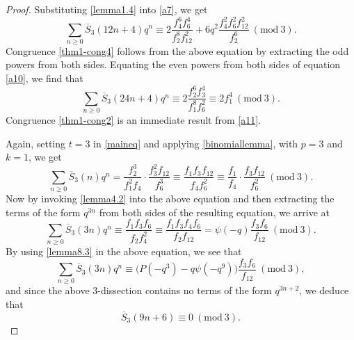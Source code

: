 \documentclass[12pt]{amsart}
\theoremstyle{plain}
\theoremstyle{definition}
\begin{document}
\begin{proof}
Substituting \eqref{lemma1.4} into \eqref{a7}, we get
\begin{equation}
\sum_{n \geq 0} \overline{S}_{3}(12n+4) q^{n} \equiv  2 \dfrac{f_{4}^{6} f_{6}^{4}}{f_{2}^{8} f_{12}^{2}} + 6 q^{2}  \dfrac{f_{4}^{2} f_{6}^{2} f_{12}^{2}}{f_{2}^{6}}  \ (\mathrm{mod} \ 3).  \label{a10}
\end{equation}
Congruence \eqref{thm1-cong4} follows from the above equation by extracting the odd powers from both sides. Equating the even powers from both sides of equation \eqref{a10}, we find that
\begin{equation}
\sum_{n \geq 0} \overline{S}_{3}(24n+4) q^{n} \equiv  2 \dfrac{f_{2}^{6} f_{3}^{4}}{f_{1}^{8} f_{6}^{2}} \equiv 2f_{1}^{4}  \ (\mathrm{mod} \ 3).  \label{a11}
\end{equation}
Congruence \eqref{thm1-cong2} is an immediate result from \eqref{a11}.

Again, setting $t=3$ in \eqref{maineq} and applying \eqref{binomiallemma}, with $p=3$ and $k=1$, we get 
\begin{equation*}
\sum_{n \geq 0} \overline{S}_{3}(n) q^{n} = \frac{f_{2}^3 }{f_{1}^2 f_{4}} \cdot \frac{f_{3}^2 f_{12}}{f_{6}^3} \equiv \frac{f_{1} f_{3} f_{12}}{f_{4} f_{6}^2} \equiv \frac{f_{1}}{f_{4}} \cdot  \frac{f_{3} f_{12}}{f_{6}^2} \ (\mathrm{mod} \ 3).
\end{equation*}
Now by invoking \eqref{lemma4.2} into the above equation and then extracting the terms of the form $q^{3n}$ from both sides of the resulting equation, we arrive at
\begin{equation*}
\sum_{n \geq 0} \overline{S}_{3}(3n) q^{n} \equiv \frac{f_1 f_3 f_6}{f_2 f_4^2} \equiv \frac{f_1 f_3 f_4 f_6}{f_2 f_{12}} = \psi(-q) \frac{f_3 f_6}{f_{12}} \ (\mathrm{mod} \ 3).
\end{equation*}
By using \eqref{lemma8.3} in the above equation, we see that
\begin{equation}
\sum_{n \geq 0} \overline{S}_{3}(3n) q^{n} \equiv\big( P(-q^3) - q \psi(-q^9) \big) \frac{f_3 f_6}{f_{12}} \ (\mathrm{mod} \ 3),  \label{sel01}
\end{equation}
and since the above $3$-dissection contains no terms of the form $q^{3n+2}$, we deduce that
\begin{equation*}
\overline{S}_{3}(9n+6)  \equiv 0 \ (\mathrm{mod} \ 3).
\end{equation*}


\end{proof}
\end{document}
